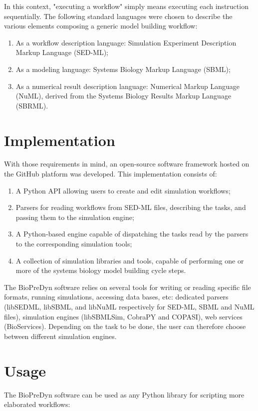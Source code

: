 \documentclass[portrait,a1,usenames,dvipsnames]{sciposter}
\begin{document}
\begin{multicols}{2}
In this context, "executing a workflow" simply means executing each instruction
sequentially. The following standard languages were chosen to describe the
various elements composing a generic model building workflow:
\begin{enumerate}
\item As a workflow description language: Simulation Experiment Description
Markup Language (SED-ML);
\item As a modeling language: Systems Biology Markup Language (SBML);
\item As a numerical result description language: Numerical Markup Language
(NuML), derived from the Systems Biology Results Markup Language (SBRML).
\end{enumerate}

\section{Implementation}
With those requirements in mind, an open-source software framework hosted on the
GitHub platform was developed. This implementation consists of:
\begin{enumerate}
\item A Python API allowing users to create and edit simulation workflows;
\item Parsers for reading workflows from SED-ML files, describing the tasks,
and passing them to the simulation engine;
\item A Python-based engine capable of dispatching the tasks read by the parsers
to the corresponding simulation tools;
\item A collection of simulation libraries and tools, capable of performing one
or more of the systems biology model building cycle steps.
\end{enumerate}
The BioPreDyn software relies on several tools for writing or reading specific
file formats, running simulations, accessing data bases, etc: dedicated parsers
(libSEDML, libSBML, and libNuML respectively for SED-ML, SBML and NuML files),
simulation engines (libSBMLSim\cite{Takizawa2013}, CobraPY\cite{Ebrahim2013}
and COPASI\cite{Hoops2006}), web services (BioServices\cite{Cokelaer2013}).
Depending on the task to be done, the user can therefore choose between
different simulation engines.

\section{Usage}
The BioPreDyn software can be used as any Python library for scripting more
elaborated workflows:

{}

\end{multicols}
\end{document}
